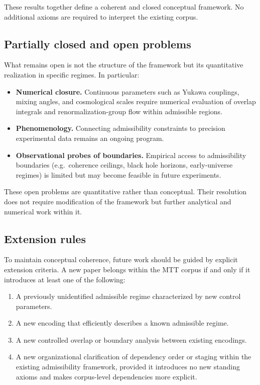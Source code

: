 \documentclass[11pt]{article}
\begin{document}
These results together define a coherent and closed conceptual framework. No additional axioms are required to interpret the existing corpus.

\subsection{Partially closed and open problems}

What remains open is not the structure of the framework but its quantitative realization in specific regimes. In particular:

\begin{itemize}
\item \textbf{Numerical closure.}  
  Continuous parameters such as Yukawa couplings, mixing angles, and cosmological scales require numerical evaluation of overlap integrals and renormalization-group flow within admissible regions.
\item \textbf{Phenomenology.}  
  Connecting admissibility constraints to precision experimental data remains an ongoing program.
\item \textbf{Observational probes of boundaries.}  
  Empirical access to admissibility boundaries (e.g.\ coherence ceilings, black hole horizons, early-universe regimes) is limited but may become feasible in future experiments.
\end{itemize}

These open problems are quantitative rather than conceptual. Their resolution does not require modification of the framework but further analytical and numerical work within it.

\subsection{Extension rules}

To maintain conceptual coherence, future work should be guided by explicit extension criteria. A new paper belongs within the MTT corpus if and only if it introduces at least one of the following:

\begin{enumerate}
\item A previously unidentified admissible regime characterized by new control parameters.
\item A new encoding that efficiently describes a known admissible regime.
\item A new controlled overlap or boundary analysis between existing encodings.
\item A new organizational clarification of dependency order or staging within the existing admissibility framework, provided it introduces no new standing axioms and makes corpus-level dependencies more explicit.
\end{enumerate}
\end{document}
